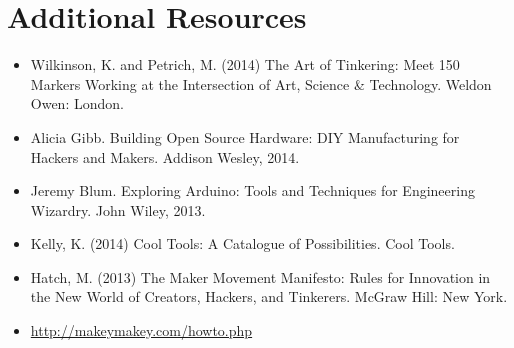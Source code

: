 \documentclass{../fal_assignment}
\begin{document}
\section*{Additional Resources}

\begin{itemize}
    \item Wilkinson, K. and Petrich, M. (2014) The Art of Tinkering: Meet 150 Markers Working at the Intersection of Art, Science \& Technology. Weldon Owen: London.
    \item Alicia Gibb. Building Open Source Hardware: DIY Manufacturing for Hackers and Makers. Addison Wesley, 2014. 
    \item Jeremy Blum. Exploring Arduino: Tools and Techniques for Engineering Wizardry. John Wiley, 2013. 
    \item Kelly, K. (2014) Cool Tools: A Catalogue of Possibilities. Cool Tools.
    \item Hatch, M. (2013) The Maker Movement Manifesto: Rules for Innovation in the New World of Creators, Hackers, and Tinkerers. McGraw Hill: New York.
    \item \url{http://makeymakey.com/howto.php}
\end{itemize}
\end{document}
